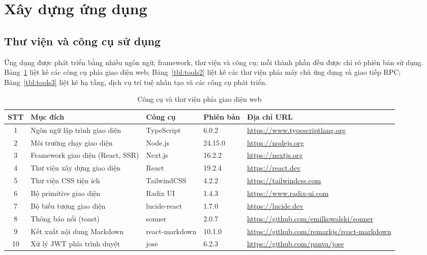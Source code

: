\documentclass[../DoAn.tex]{subfiles}
\begin{document}
\section{Xây dựng ứng dụng}
\subsection{Thư viện và công cụ sử dụng}
Ứng dụng được phát triển bằng nhiều ngôn ngữ, framework, thư viện và công cụ; mỗi thành phần đều được chỉ rõ phiên bản sử dụng. Bảng~\ref{tbl:tools1} liệt kê các công cụ phía giao diện web; Bảng~\ref{tbl:tools2} liệt kê các thư viện phía máy chủ ứng dụng và giao tiếp RPC; Bảng~\ref{tbl:tools3} liệt kê hạ tầng, dịch vụ trí tuệ nhân tạo và các công cụ phát triển.

\begin{table}[H]
\centering
\small
\begin{tabular}{|c|p{3.2cm}|p{2.5cm}|p{2cm}|p{3.3cm}|}
\hline
\textbf{STT} & \textbf{Mục đích} & \textbf{Công cụ} & \textbf{Phiên bản} & \textbf{Địa chỉ URL} \\ \hline
1 & Ngôn ngữ lập trình giao diện & TypeScript & 6.0.2 & \url{https://www.typescriptlang.org} \\ \hline
2 & Môi trường chạy giao diện & Node.js & 24.15.0 & \url{https://nodejs.org} \\ \hline
3 & Framework giao diện (React, SSR) & Next.js & 16.2.2 & \url{https://nextjs.org} \\ \hline
4 & Thư viện xây dựng giao diện & React & 19.2.4 & \url{https://react.dev} \\ \hline
5 & Thư viện CSS tiện ích & TailwindCSS & 4.2.2 & \url{https://tailwindcss.com} \\ \hline
6 & Bộ primitive giao diện & Radix UI & 1.4.3 & \url{https://www.radix-ui.com} \\ \hline
7 & Bộ biểu tượng giao diện & lucide-react & 1.7.0 & \url{https://lucide.dev} \\ \hline
8 & Thông báo nổi (toast) & sonner & 2.0.7 & \url{https://github.com/emilkowalski/sonner} \\ \hline
9 & Kết xuất nội dung Markdown & react-markdown & 10.1.0 & \url{https://github.com/remarkjs/react-markdown} \\ \hline
10 & Xử lý JWT phía trình duyệt & jose & 6.2.3 & \url{https://github.com/panva/jose} \\ \hline
\end{tabular}
\caption{Công cụ và thư viện phía giao diện web}
\label{tbl:tools1}
\end{table}
\end{document}

